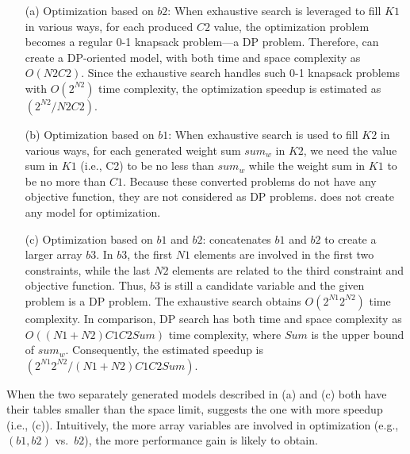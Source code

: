  \begin{enumerate}
     \item[(a)] Optimization based on $b2$: %
     When exhaustive search is leveraged to
     fill $K1$ in various ways, for each produced $C2$ value, the optimization problem becomes a regular 0-1 knapsack problem---a DP problem. Therefore, \tool can create a DP-oriented model, with both time and space complexity as $O(N2C2)$. Since the exhaustive search handles such 0-1 knapsack problems with $O(2^{N2})$ time complexity, the optimization speedup is estimated as $(2^{N2}/N2C2)$.
     
      \item[(b)] Optimization based on $b1$: When exhaustive search is used to fill $K2$ in various ways, for each generated weight sum $sum_w$ in $K2$, we need the value sum in $K1$ (i.e., C2) to be no less than $sum_w$ while the weight sum in $K1$ to be no more than $C1$. Because these converted problems do not have any objective function, they are not considered as DP problems. \tool does not create any model for optimization. 
     
     \item[(c)] Optimization based on $b1$ and $b2$: \tool concatenates $b1$ and $b2$ to create a larger array $b3$. In $b3$, the first $N1$ elements are involved in the first two constraints, while the last $N2$ elements are related to the third constraint and objective function. Thus, $b3$ is still a candidate variable and the given problem is a DP problem. The exhaustive search obtains $O(2^{N1}2^{N2})$ time complexity. In comparison, DP search has both time and space complexity as 
     $O((N1+N2)C1C2Sum)$ time complexity, where $Sum$ is the upper bound of $sum_w$. Consequently, the estimated speedup is $(2^{N1}2^{N2}/(N1+N2)C1C2Sum)$.
 \end{enumerate}
 When the two separately generated models described in (a) and (c) both have their tables smaller than the space limit, \tool suggests the one with more speedup (i.e., (c)). Intuitively, the more array variables are involved in optimization (e.g., $(b1, b2)$ vs.~$b2$), the more performance gain \tool is likely to obtain.  
 
